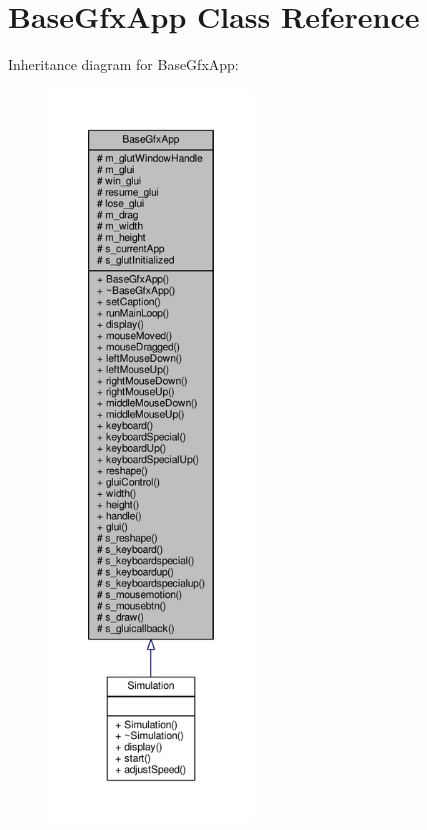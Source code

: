 \hypertarget{classBaseGfxApp}{\section{Base\-Gfx\-App Class Reference}
\label{classBaseGfxApp}
}


Inheritance diagram for Base\-Gfx\-App\-:\nopagebreak
\begin{figure}[H]
\begin{center}
\leavevmode
\includegraphics[height=550pt]{classBaseGfxApp__inherit__graph}
\end{center}
\end{figure}


